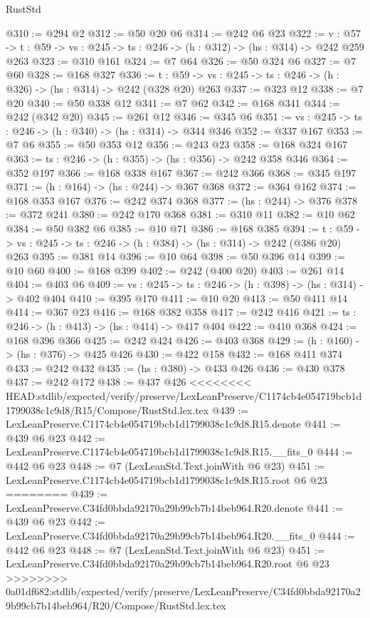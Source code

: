 \begin{lexlean}{RustStd}
\begin{coremodule}
{\begin{coremodule}
@310 := @294 @2
@312 := @50 @20 @6
@314 := @242 @6 @23
@322 := {v : @57} ->
  {t : @59} -> {vs : @245} -> {ts : @246} -> (h : @312) -> (hs : @314) -> @242 @259 @263
@323 := @310 @161
@324 := @7 @64
@326 := @50 @324 @6
@327 := @7 @60
@328 := @168 @327
@336 := {t : @59} -> {vs : @245} -> {ts : @246} -> (h : @326) -> (hs : @314) -> @242 (@328 @20) @263
@337 := @323 @12
@338 := @7 @20
@340 := @50 @338 @12
@341 := @7 @62
@342 := @168 @341
@344 := @242 (@342 @20)
@345 := @261 @12
@346 := @345 @6
@351 := {vs : @245} -> {ts : @246} -> (h : @340) -> (hs : @314) -> @344 @346
@352 := @337 @167
@353 := @7 @6
@355 := @50 @353 @12
@356 := @243 @23
@358 := @168 @324 @167
@363 := {ts : @246} -> (h : @355) -> (hs : @356) -> @242 @358 @346
@364 := @352 @197
@366 := @168 @338 @167
@367 := @242 @366
@368 := @345 @197
@371 := (h : @164) -> (hs : @244) -> @367 @368
@372 := @364 @162
@374 := @168 @353 @167
@376 := @242 @374 @368
@377 := (hs : @244) -> @376
@378 := @372 @241
@380 := @242 @170 @368
@381 := @310 @11
@382 := @10 @62
@384 := @50 @382 @6
@385 := @10 @71
@386 := @168 @385
@394 := {t : @59} -> {vs : @245} -> {ts : @246} -> (h : @384) -> (hs : @314) -> @242 (@386 @20) @263
@395 := @381 @14
@396 := @10 @64
@398 := @50 @396 @14
@399 := @10 @60
@400 := @168 @399
@402 := @242 (@400 @20)
@403 := @261 @14
@404 := @403 @6
@409 := {vs : @245} -> {ts : @246} -> (h : @398) -> (hs : @314) -> @402 @404
@410 := @395 @170
@411 := @10 @20
@413 := @50 @411 @14
@414 := @367 @23
@416 := @168 @382 @358
@417 := @242 @416
@421 := {ts : @246} -> (h : @413) -> (hs : @414) -> @417 @404
@422 := @410 @368
@424 := @168 @396 @366
@425 := @242 @424
@426 := @403 @368
@429 := (h : @160) -> (hs : @376) -> @425 @426
@430 := @422 @158
@432 := @168 @411 @374
@433 := @242 @432
@435 := (hs : @380) -> @433 @426
@436 := @430 @378
@437 := @242 @172
@438 := @437 @426
<<<<<<<< HEAD:stdlib/expected/verify/preserve/LexLeanPreserve/C1174cb4e054719bcb1d1799038c1c9d8/R15/Compose/RustStd.lex.tex
@439 := LexLeanPreserve.C1174cb4e054719bcb1d1799038c1c9d8.R15.denote
@441 := @439 @6 @23
@442 := LexLeanPreserve.C1174cb4e054719bcb1d1799038c1c9d8.R15.__fits_0
@444 := @442 @6 @23
@448 := @7 (LexLeanStd.Text.joinWith @6 @23)
@451 := LexLeanPreserve.C1174cb4e054719bcb1d1799038c1c9d8.R15.root @6 @23
========
@439 := LexLeanPreserve.C34fd0bbda92170a29b99cb7b14beb964.R20.denote
@441 := @439 @6 @23
@442 := LexLeanPreserve.C34fd0bbda92170a29b99cb7b14beb964.R20.__fits_0
@444 := @442 @6 @23
@448 := @7 (LexLeanStd.Text.joinWith @6 @23)
@451 := LexLeanPreserve.C34fd0bbda92170a29b99cb7b14beb964.R20.root @6 @23
>>>>>>>> 0a01df682:stdlib/expected/verify/preserve/LexLeanPreserve/C34fd0bbda92170a29b99cb7b14beb964/R20/Compose/RustStd.lex.tex

\end{coremodule}}
\end{coremodule}
\end{lexlean}
